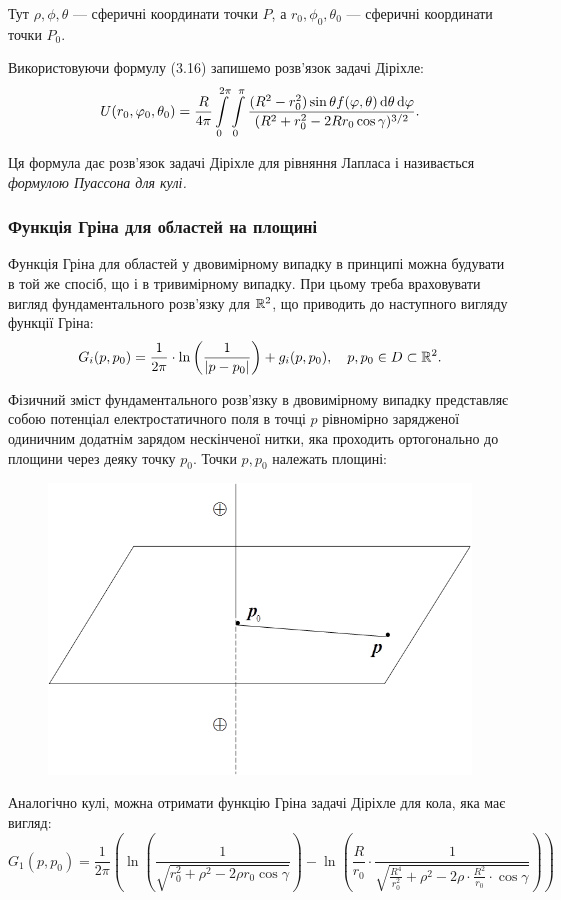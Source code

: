 Тут $\rho, \phi, \theta$ --- сферичні координати точки $P$, а $r_0, \phi_0, \theta_0$ --- сферичні координати точки $P_0$. \medskip

\begin{th_formula}
	Використовуючи формулу (3.16) запишемо розв'язок задачі Діріхле:
	\begin{equation}
		U(r_0, \varphi_0, \theta_0) = \frac{R}{4 \pi} \displaystyle\int\limits_0^{2 \pi} \displaystyle\int\limits_0^\pi \frac{(R^2 - r_0^2) \sin \theta f(\varphi, \theta) \mathop{}\!\mathrm{d} \theta \mathop{}\!\mathrm{d} \varphi}{(R^2 + r_0^2 - 2 R r_0 \cos \gamma)^{3/2}}.
	\end{equation}

	Ця формула дає розв'язок задачі Діріхле для рівняння Лапласа і називається \it{формулою Пуассона для кулі}.
\end{th_formula}

\subsubsection{Функція Гріна для областей на площині}

Функція Гріна для областей у двовимірному випадку в принципі можна будувати в той же спосіб, що і в тривимірному випадку. При цьому треба враховувати вигляд фундаментального розв'язку для $\mathbb{R}^2$, що приводить до наступного вигляду функції Гріна:
\begin{equation}
	G_i (p, p_0) = \frac{1}{2 \pi} \cdot \ln \left( \frac{1}{|p - p_0|} \right) + g_i (p, p_0), \quad p, p_0 \in D \subset \mathbb{R}^2.
\end{equation}

Фізичний зміст фундаментального розв'язку в двовимірному випадку представляє собою потенціал електростатичного поля в точці $p$ рівномірно зарядженої одиничним додатнім зарядом  нескінченої нитки, яка проходить ортогонально до площини через деяку точку $p_0$. Точки $p, p_0$ належать площині:
\begin{figure}[H]
	\centering
	\includegraphics[width=.75\textwidth]{img/21-2.png}
\end{figure}

Аналогічно кулі, можна отримати функцію Гріна задачі Діріхле для кола, яка має вигляд:
\begin{equation}
	G_1 (p, p_0) = \frac{1}{2 \pi} \left( \ln \left( \frac{1}{\sqrt{r_0^2 + \rho^2 - 2 \rho r_0 \cos \gamma}} \right) - \ln \left( \frac{R}{r_0} \cdot \frac{1}{\sqrt{\frac{R^4}{r_0^2} + \rho^2 - 2 \rho \cdot \frac{R^2}{r_0} \cdot \cos \gamma}} \right) \right)
\end{equation}

